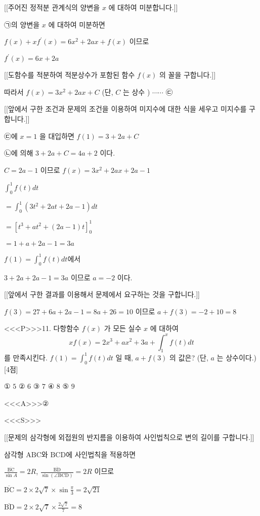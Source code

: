 \documentclass{oblivoir}
\begin{document}
[[주어진 정적분 관계식의 양변을 $x$ 에 대하여 미분합니다.]]

㉠의 양변을 $x$ 에 대하여 미분하면

$f(x)+x f^{\prime}(x)=6 x^{2}+2 a x+f(x) $ 이므로

$f^{\prime}(x)=6 x+2 a$

[[도함수를 적분하여 적분상수가 포함된 함수 $f(x)$ 의 꼴을 구합니다.]]

따라서 $f(x)=3 x^{2}+2 a x+C$ (단, $C$ 는 상수 ) $\cdots \cdots$  ㉢

[[앞에서 구한 조건과 문제의 조건을 이용하여 미지수에 대한 식을 세우고 미지수를 구합니다.]]

㉢에 $x=1$ 을 대입하면 $f(1)=3+2 a+C$

㉡에 의해 $3+2 a+C=4 a+2$ 이다.

$C=2 a-1 $ 이므로 $f(x)=3 x^{2}+2 a x+2 a-1$

$\int_{0}^{1} f(t) d t $

$=\int_{0}^{1}\left(3 t^{2}+2 a t+2 a-1\right) d t$

$=\left[t^{3}+a t^{2}+(2 a-1) t\right]_{0}^{1}$

$=1+a+2 a-1=3 a$

$f(1)=\int_{0}^{1} f(t) d t$에서

$3+2 a+2 a-1=3 a$ 이므로 $a=-2$ 이다.

[[앞에서 구한 결과를 이용해서 문제에서 요구하는 것을 구합니다.]]

$f(3)=27+6 a+2 a-1=8 a+26=10$ 이므로 $a+f(3)=-2+10=8$


<<<P>>>11. 다항함수 $f(x)$ 가 모든 실수 $x$ 에 대하여
$$
x f(x)=2 x^{3}+a x^{2}+3 a+\int_{1}^{x} f(t) d t
$$
를 만족시킨다. $f(1)=\int_{0}^{1} f(t) d t$ 일 때, $a+f(3)$ 의 값은? (단, $a$ 는 상수이다.) [4점]

① $5$
② $6$
③ $7$
④ $8$
⑤ $9$

<<<A>>>②

<<<S>>>

[[문제의 삼각형에 외접원의 반지름을 이용하여 사인법칙으로 변의 길이를 구합니다.]]

삼각형 $\mathrm{ABC}$와 $\mathrm{BCD}$에 사인법칙을 적용하면 

$\frac{\overline{\mathrm{BC}}}{\sin A}=2R$, $\frac{\overline{\mathrm{BD}}}{\sin (\angle \mathrm{BCD})} =2R$ 이므로

$\overline{\mathrm{BC}}=2 \times 2 \sqrt{7} \times \sin \frac{\pi}{3}=2 \sqrt{21}$

$\overline{\mathrm{BD}}=2 \times 2 \sqrt{7} \times \frac{2 \sqrt{7}}{7}=8$
\end{document}
